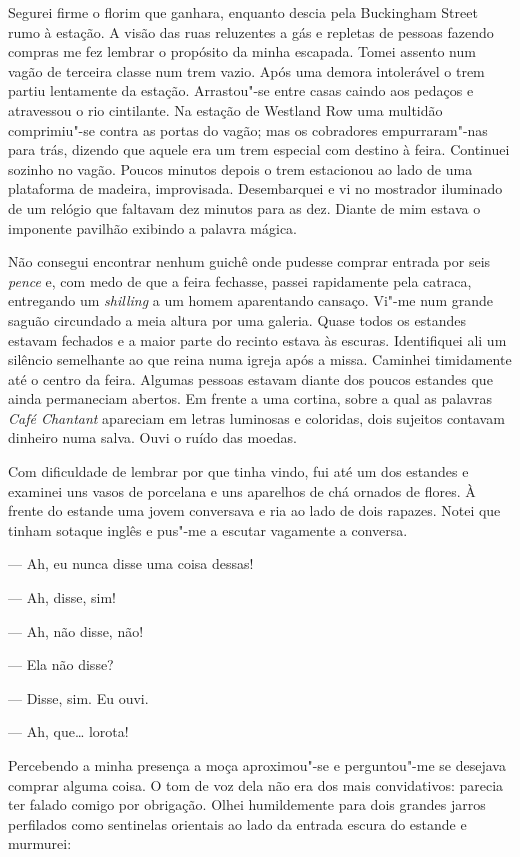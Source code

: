 Segurei firme o florim que ganhara, enquanto descia pela Buckingham Street rumo
à estação.  A visão das ruas reluzentes a gás e repletas de pessoas fazendo
compras me fez lembrar o propósito da minha escapada.  Tomei assento num vagão
de terceira classe num trem vazio.  Após uma demora intolerável o trem partiu
lentamente da estação.  Arrastou"-se entre casas caindo aos pedaços e atravessou
o rio cintilante.  Na estação de Westland Row uma multidão comprimiu"-se contra
as portas do vagão; mas os cobradores empurraram"-nas para trás, dizendo que
aquele era um trem especial com destino à feira.  Continuei sozinho no vagão.
Poucos minutos depois o trem estacionou ao lado de uma plataforma de madeira,
improvisada.  Desembarquei e vi no mostrador iluminado de um relógio que
faltavam dez minutos para as dez.  Diante de mim estava o imponente pavilhão
exibindo a palavra mágica.

Não consegui encontrar nenhum guichê onde pudesse comprar entrada por seis
\textit{pence} e, com medo de que a feira fechasse, passei rapidamente pela
catraca, entregando um \textit{shilling} a um homem aparentando cansaço.  Vi"-me
num grande saguão circundado a meia altura por uma galeria.  Quase todos os
estandes estavam fechados e a maior parte do recinto estava às escuras.
Identifiquei ali um silêncio semelhante ao que reina numa igreja após a missa.
Caminhei timidamente até o centro da feira.  Algumas pessoas estavam diante dos
poucos estandes que ainda permaneciam abertos.  Em frente a uma cortina, sobre
a qual as palavras \textit{Café Chantant} apareciam em letras luminosas e
coloridas, dois sujeitos contavam dinheiro numa salva.  Ouvi o ruído das
moedas.

Com dificuldade de lembrar por que tinha vindo, fui até um dos estandes e
examinei uns vasos de porcelana e uns aparelhos de chá ornados de flores.  À
frente do estande uma jovem conversava e ria ao lado de dois rapazes.  Notei
que tinham sotaque inglês e pus"-me a escutar vagamente a conversa.

--- Ah, eu nunca disse uma coisa dessas!

--- Ah, disse, sim!

--- Ah, não disse, não!

--- Ela não disse?

--- Disse, sim.  Eu ouvi.

--- Ah, que\ldots{} lorota!

Percebendo a minha presença a moça aproximou"-se e perguntou"-me se desejava
comprar alguma coisa.  O tom de voz dela não era dos mais convidativos: parecia
ter falado comigo por obrigação.  Olhei humildemente para dois grandes jarros
perfilados como sentinelas orientais ao lado da entrada escura do estande e
murmurei:


